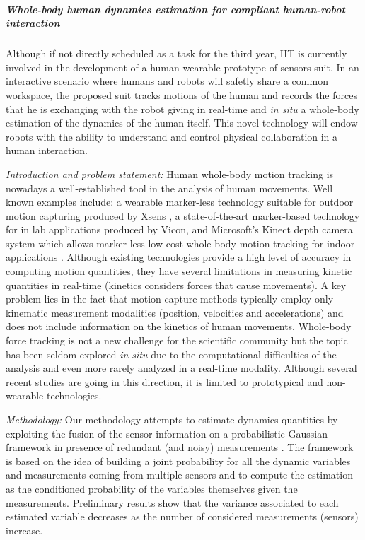 \subparagraph*{Whole-body human dynamics estimation for compliant human-robot interaction} 
Although if not directly scheduled as a task for the third year, IIT is currently involved in the development of a human wearable prototype of sensors suit.  In an interactive scenario where humans and robots will safetly share a common workspace, the proposed suit tracks motions of the human and records the forces that he is exchanging with the robot giving in real-time  and \emph{in situ} a whole-body estimation of the dynamics of the human itself.  This novel technology will endow robots with the ability to understand and control physical collaboration in a human interaction.

\textit{Introduction and problem statement:} Human whole-body motion tracking is nowadays a well-established tool in the analysis of human movements. Well known examples include: a wearable marker-less technology suitable for outdoor motion capturing produced by Xsens \cite{roetenberg2009xsens}, a state-of-the-art marker-based technology for in lab applications produced by Vicon, and Microsoft's Kinect depth camera system which allows marker-less low-cost whole-body motion tracking for  indoor applications \cite{zhang2012microsoft}.
Although existing technologies provide a high level of accuracy in computing motion quantities, they have several limitations in measuring kinetic quantities in real-time (kinetics considers forces that cause movements).  A key problem lies in the fact that motion capture methods typically employ only kinematic measurement modalities (position, velocities and accelerations) \cite{Bonnet2013} and does not include information on the kinetics of human movements.  
Whole-body force tracking is not a new challenge for the scientific community but the topic has been seldom explored \emph{in situ} due to the computational difficulties of the analysis and even more rarely analyzed in a real-time modality. Although several recent studies are going in this direction, it is limited to prototypical and non-wearable technologies. 

\textit{ Methodology:} Our methodology attempts to estimate dynamics quantities by exploiting the fusion of the sensor information on a probabilistic Gaussian framework in presence of redundant (and noisy) measurements \cite{Latella2015}.  The framework is based on the idea of building a joint probability for all the dynamic variables and measurements coming from multiple sensors and to compute the estimation as the conditioned probability of the variables themselves given the measurements.  Preliminary results show that the variance associated to each estimated variable decreases as the number of considered measurements (sensors) increase.

